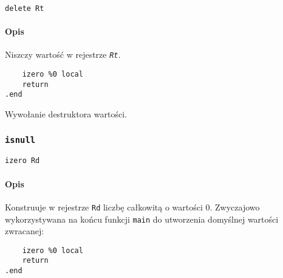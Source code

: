 \begin{lstlisting}
delete Rt
\end{lstlisting}

\paragraph*{Opis} Niszczy wartość w rejestrze \texttt{\emph{Rt}}.

\begin{lstlisting}
	izero %0 local
	return
.end
\end{lstlisting}

Wywołanie destruktora wartości.

\subsubsection{\texttt{isnull}}

\begin{lstlisting}
izero Rd
\end{lstlisting}

\paragraph*{Opis} Konstruuje w rejestrze \texttt{Rd} liczbę całkowitą o wartości 0.
Zwyczajowo wykorzystywana na końcu funkcji \texttt{main} do utworzenia domyślnej wartości zwracanej:

\begin{lstlisting}
	izero %0 local
	return
.end
\end{lstlisting}
